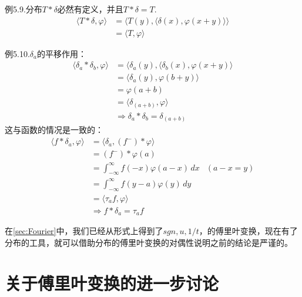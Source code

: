 \documentclass{ctexbook}
\begin{document}
\noindent  例5.9.分布$T*\delta$必然有定义，并且$T*\delta=T$.
\begin{align*}
    \langle T*\delta,\varphi\rangle & =\langle T(y),\langle \delta(x),\varphi(x+y)\rangle\rangle \\
                                    & =\langle T,\varphi\rangle
\end{align*}

\noindent 例5.10.$\delta_a$的平移作用：
\begin{align*}
    \langle \delta_a*\delta_b,\varphi\rangle & =\langle \delta_a(y),\langle\delta_b(x),\varphi(x+y)\rangle \\
                                             & =\langle \delta_a(y),\varphi(b+y)\rangle                    \\
                                             & =\varphi(a+b)                                               \\
                                             & =\langle\delta_{(a+b)},\varphi\rangle                       \\
                                             & \Rightarrow \delta_a*\delta_b=\delta_{(a+b)}
\end{align*}
这与函数的情况是一致的：\begin{align*}
    \langle f*\delta_a,\varphi\rangle & =\langle \delta_a,(f^-)*\varphi\rangle                  \\
                                      & =(f^-)*\varphi(a)                                       \\
                                      & =\int_{-\infty}^{\infty}f(-x)\varphi(a-x)\,dx & (a-x=y) \\
                                      & =\int_{-\infty}^{\infty}f(y-a)\varphi(y)\,dy            \\
                                      & =\langle \tau_a f,\varphi\rangle                        \\
                                      & \Rightarrow f*\delta_a=\tau_a f
\end{align*}

在\ref{sec:Fourier}中，我们已经从形式上得到了$sgn,u,1/t$，的傅里叶变换，现在有了
分布的工具，就可以借助分布的傅里叶变换的对偶性说明之前的结论是严谨的。

\chapter{关于傅里叶变换的进一步讨论}
\end{document}
